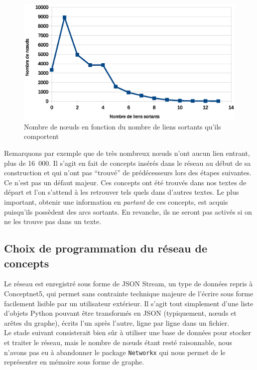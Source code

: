 \documentclass[a4paper, 12pt]{article}
\newcommand{\pyt}[1]{\texttt{#1}}%
\begin{document}
\begin{figure}[h]
 \centering
 \includegraphics[width=12cm]{./liens_sortants.eps}
 \caption{Nombre de n\oe{}uds en fonction du nombre de liens sortants qu'ils comportent}
 \label{fig:liens_sortants}
\end{figure}

Remarquons par exemple que de très nombreux n\oe{}uds n'ont aucun lien entrant, plus de 16~000. Il s'agit en fait de concepts insérés dans le réseau au début de sa construction et qui n'ont pas ``trouvé'' de prédécesseurs lors des étapes suivantes. Ce n'est pas un défaut majeur. Ces concepts ont été trouvés dans nos textes de départ et l'on s'attend à les retrouver tels quels dans d'autres textes. Le plus important, obtenir une information en \textit{partant} de ces concepts, est acquis puisqu'ils possèdent des arcs sortants. En revanche, ils ne seront pas activés si on ne les trouve pas dans un texte.


\subsection{Choix de programmation du réseau de concepts}

Le réseau est enregistré sous forme de JSON Stream, un type de données repris à Conceptnet5, qui permet sans contrainte technique majeure de l'écrire sous forme facilement lisible par un utilisateur extérieur. Il s'agit tout simplement d'une liste d'objets Python pouvant être transformés en JSON (typiquement, n\oe{}uds et arêtes du graphe), écrits l'un après l'autre, ligne par ligne dans un fichier.\\

Le stade suivant consisterait bien sûr à utiliser une base de données pour stocker et traiter le réseau, mais le nombre de n\oe{}uds étant resté raisonnable, nous n'avons pas eu à abandonner le package \pyt{Networkx} qui nous permet de le représenter en mémoire sous forme de graphe.
\end{document}
